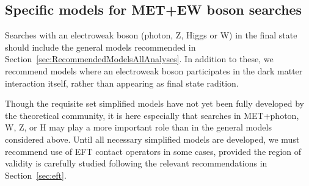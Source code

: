 \documentclass[a4,debug,notitlepage,nobib]{tufte-handout}
\newif\ifATLAS
\newif\ifCMS
\begin{document}
% 

\ifATLAS
\textbf{[Open point: Add here implementation details for ATLAS.]}
\fi

\ifCMS
\textbf{[Open point: Add here implementation details for CMS..]}
\fi


\subsection{Specific models for MET+EW boson searches}

Searches with an electroweak boson (photon, Z, Higgs or W) in the
final state should include the general models recommended in
Section~\ref{sec:RecommendedModelsAllAnalyses}. In addition to these,
we recommend models where an electroweak boson participates in
the dark matter interaction itself, rather than appearing as final
state radition.

Though the requisite set simplified models have not yet been fully
developed by the theoretical community, it is here especially that
searches in MET+photon, W, Z, or H may play a more important role than
in the general models considered above. Until all necessary simplified models
are developed, we must recommend use of EFT contact operators
in some cases, provided the region of validity is carefully studied
following the relevant recommendations in Section~\ref{sec:eft}.


\end{document}
